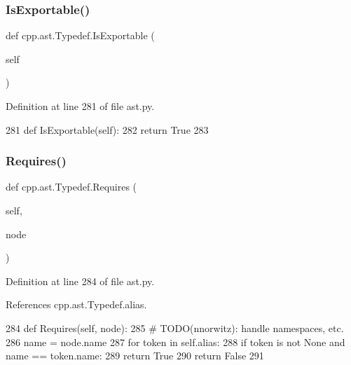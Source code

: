 \subsubsection{\texorpdfstring{Is\+Exportable()}{IsExportable()}}
{\footnotesize\ttfamily def cpp.\+ast.\+Typedef.\+Is\+Exportable (\begin{DoxyParamCaption}\item[{}]{self }\end{DoxyParamCaption})}



Definition at line 281 of file ast.\+py.


\begin{DoxyCode}
281     \textcolor{keyword}{def }IsExportable(self):
282         \textcolor{keywordflow}{return} \textcolor{keyword}{True}
283 
\end{DoxyCode}
\mbox{\label{classcpp_1_1ast_1_1Typedef_aa9f65f4a97ba340f2c9ebc5e7ce27e8c}} 
\subsubsection{\texorpdfstring{Requires()}{Requires()}}
{\footnotesize\ttfamily def cpp.\+ast.\+Typedef.\+Requires (\begin{DoxyParamCaption}\item[{}]{self,  }\item[{}]{node }\end{DoxyParamCaption})}



Definition at line 284 of file ast.\+py.



References cpp.\+ast.\+Typedef.\+alias.


\begin{DoxyCode}
284     \textcolor{keyword}{def }Requires(self, node):
285         \textcolor{comment}{# TODO(nnorwitz): handle namespaces, etc.}
286         name = node.name
287         \textcolor{keywordflow}{for} token \textcolor{keywordflow}{in} self.alias:
288             \textcolor{keywordflow}{if} token \textcolor{keywordflow}{is} \textcolor{keywordflow}{not} \textcolor{keywordtype}{None} \textcolor{keywordflow}{and} name == token.name:
289                 \textcolor{keywordflow}{return} \textcolor{keyword}{True}
290         \textcolor{keywordflow}{return} \textcolor{keyword}{False}
291 
\end{DoxyCode}


